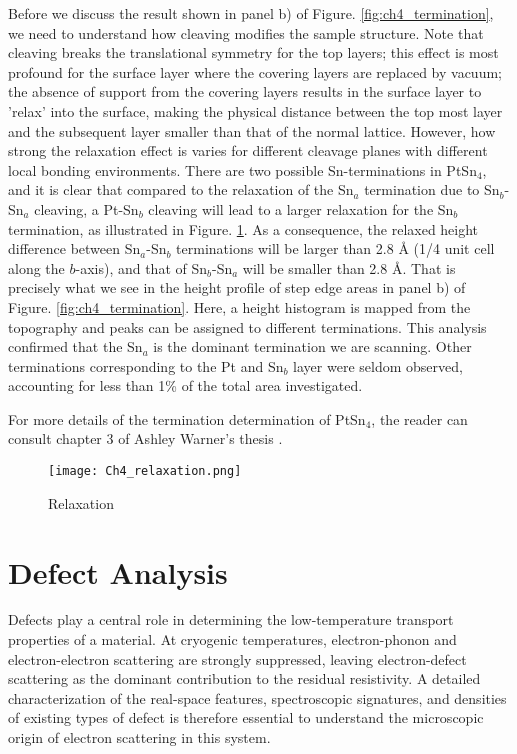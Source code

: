 Before we discuss the result shown in panel b) of Figure. \ref{fig:ch4_termination}, we need to understand how cleaving modifies the sample structure. Note that cleaving breaks the translational symmetry for the top layers; this effect is most profound for the surface layer where the covering layers are replaced by vacuum; the absence of support from the covering layers results in the surface layer to 'relax' into the surface, making the physical distance between the top most layer and the subsequent layer smaller than that of the normal lattice. However, how strong the relaxation effect is varies for different cleavage planes with different local bonding environments. There are two possible Sn-terminations in PtSn$_4$, and it is clear that compared to the relaxation of the Sn$_a$ termination due to Sn$_b$-Sn$_a$ cleaving, a Pt-Sn$_b$ cleaving will lead to a larger relaxation for the Sn$_b$ termination, as illustrated in Figure. \ref{fig:ch4_relaxation}. As a consequence, the relaxed height difference between Sn$_a$-Sn$_b$ terminations will be larger than 2.8 {\AA} (1/4 unit cell along the $b$-axis), and that of Sn$_b$-Sn$_a$ will be smaller than 2.8 {\AA}. That is precisely what we see in the height profile of step edge areas in panel b) of Figure. \ref{fig:ch4_termination}. Here, a height histogram is mapped from the topography and peaks can be assigned to different terminations. This analysis confirmed that the Sn$_a$ is the dominant termination we are scanning. Other terminations corresponding to the Pt and Sn$_b$ layer were seldom observed, accounting for less than 1\% of the total area investigated. 

\par For more details of the termination determination of PtSn$_4$, the reader can consult chapter 3 of Ashley Warner's thesis \cite{warnerDefectTerraceCharacterization2022}.

\begin{figure}
	\centering
	\texttt{[image: Ch4\_relaxation.png]}
	\caption{Relaxation}
	\label{fig:ch4_relaxation}
\end{figure}



\section{Defect Analysis}
Defects play a central role in determining the low-temperature transport properties of a material. At cryogenic temperatures, electron-phonon and electron-electron scattering are strongly suppressed, leaving electron-defect scattering as the dominant contribution to the residual resistivity. A detailed characterization of the real-space features, spectroscopic signatures, and densities of existing types of defect is therefore essential to understand the microscopic origin of electron scattering in this system.

